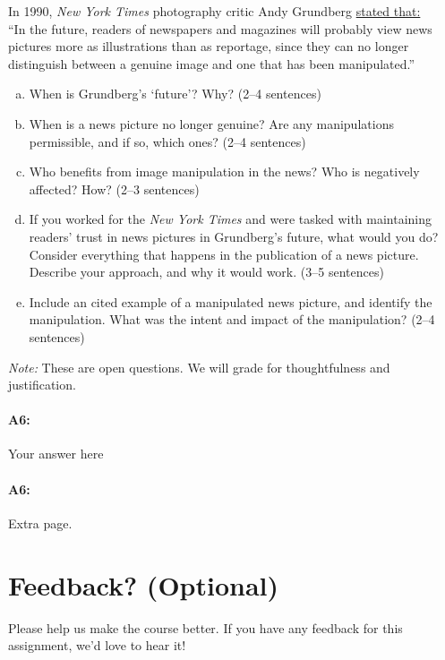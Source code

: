 In 1990, \emph{New York Times} photography critic Andy Grundberg \href{https://www.nytimes.com/1990/08/12/arts/photography-view-ask-it-no-questions-the-camera-can-lie.html}{stated that:}\\``In the future, readers of newspapers and
magazines will probably view news pictures more as
illustrations than as reportage, since they can no longer distinguish between a genuine image and one that has been manipulated.''

\begin{enumerate}[(a)]
    \item When is Grundberg's `future'? Why? (2--4 sentences)
    
    \item When is a news picture no longer genuine? Are any manipulations permissible, and if so, which ones? (2--4 sentences)
    
    \item Who benefits from image manipulation in the news? Who is negatively affected? How? (2--3 sentences) 

    \item If you worked for the \emph{New York Times} and were tasked with maintaining readers' trust in news pictures in Grundberg's future, what would you do? Consider everything that happens in the publication of a news picture. Describe your approach, and why it would work. (3--5 sentences)
    
    \item Include an cited example of a manipulated news picture, and identify the manipulation. What was the intent and impact of the manipulation? (2--4 sentences)
\end{enumerate}

\emph{Note:} These are open questions. We will grade for thoughtfulness and justification. 


\paragraph{A6:} Your answer here

\pagebreak 
\paragraph{A6:} Extra page.


\pagebreak
\section*{Feedback? (Optional)}
Please help us make the course better. If you have any feedback for this assignment, we'd love to hear it!


